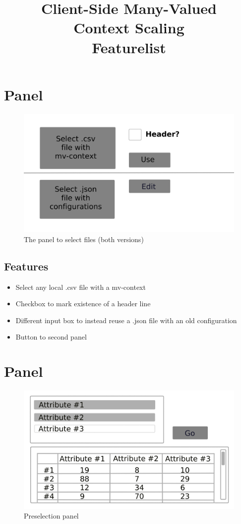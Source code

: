 \documentclass[]{article}
\title{Client-Side Many-Valued \protect\\ Context Scaling \protect\\ Featurelist}
\begin{document}
\maketitle

\newpage
\section{Panel}
\begin{figure}[H]
	\includegraphics[width=\linewidth]{panel-1.png}
	\caption{The panel to select files (both versions)}
	\label{fig:p1}
\end{figure}

\subsection{Features}
\begin{itemize}
	\item Select any local .csv file with a mv-context
	\item Checkbox to mark existence of a header line
	\item Different input box to instead reuse a .json file with an old configuration
	\item Button to second panel
\end{itemize}

\newpage
\section{Panel}
\begin{figure}[H]
	\includegraphics[width=\linewidth]{panel-2.png}
	\caption{Preselection panel}
	\label{fig:p2}
\end{figure}
\end{document}
